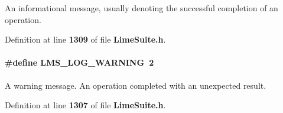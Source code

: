 An informational message, usually denoting the successful completion of an operation. 



Definition at line {\bf 1309} of file {\bf Lime\+Suite.\+h}.

\paragraph[{L\+M\+S\+\_\+\+L\+O\+G\+\_\+\+W\+A\+R\+N\+I\+NG}]{\setlength{\rightskip}{0pt plus 5cm}\#define L\+M\+S\+\_\+\+L\+O\+G\+\_\+\+W\+A\+R\+N\+I\+NG~2}\label{group__LMS__LOG__LEVEL_ga7e8f9c069720eb5d3baec17988771dca}


A warning message. An operation completed with an unexpected result. 



Definition at line {\bf 1307} of file {\bf Lime\+Suite.\+h}.

